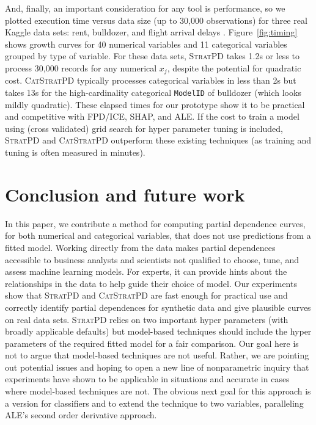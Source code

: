 \documentclass[]{article} %
\newcommand{\figref}[1]{Figure~\ref{#1}}
\newcommand{\cut}[1]{}
\newcommand{\spd}{\fontfamily{cmr}\textsc{\small StratPD}}
\newcommand{\cspd}{\fontfamily{cmr}\textsc{\small CatStratPD}}
\begin{document}
And, finally, an important consideration for any tool is performance, so we plotted execution time versus data size (up to 30,000 observations) for three real Kaggle data sets: rent, bulldozer, and flight arrival delays \citep{flights}. \figref{fig:timing} shows growth curves for 40 numerical variables and 11 categorical variables grouped by type of variable.  For these data sets, \spd{} takes 1.2s or less to process 30,000 records for any  numerical $x_j$, despite the potential for quadratic cost. \cspd{} typically processes categorical variables in less than 2s but takes 13s for the high-cardinality categorical {\tt\small ModelID} of bulldozer (which looks mildly quadratic).  These elapsed times for our prototype show it to be practical and competitive with FPD/ICE, SHAP, and ALE.  If the cost to train a model using (cross validated) grid search for hyper parameter tuning is included, \spd{} and \cspd{} outperform these existing techniques (as training and tuning is often measured in minutes).


\cut{
flight shape (5714008, 17), 6 cats
rent shape (49352, 20), no cats
bulldozer shape (362781, 14) records, 5 cats
}

\section{Conclusion and future work}

In this paper, we contribute a method for computing partial dependence curves, for both numerical and categorical variables, that does not use  predictions from a fitted model.   Working directly from the data  makes partial dependences accessible to business analysts and scientists not qualified to choose, tune, and assess machine learning models.  For experts, it can  provide hints about the relationships in the data to help guide their choice of model. Our experiments show that \spd{} and \cspd{} are fast enough for practical use and correctly identify partial dependences for synthetic data and give plausible curves on real data sets. \spd{} relies on two important hyper parameters (with broadly applicable defaults) but model-based techniques should include the hyper parameters of the required fitted model for a fair comparison.  Our goal here is not to  argue  that model-based techniques are not useful. Rather, we are pointing out potential issues and hoping to open a new line of nonparametric inquiry that experiments have shown to be applicable in situations and accurate in cases where model-based techniques are not. The obvious next goal for this approach is a version for classifiers and to extend the technique to two variables, paralleling ALE's second order derivative approach.
\end{document}
